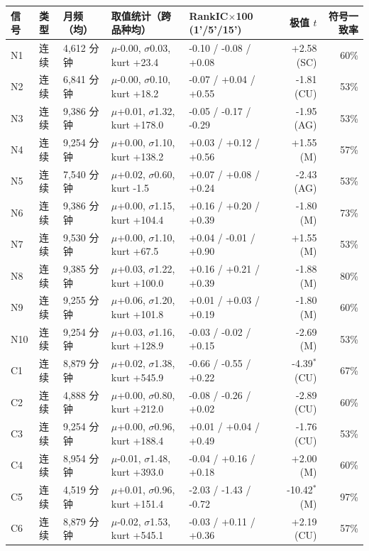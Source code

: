 \setlength{\tabcolsep}{3pt}
\begin{tabular}{lllllrr}
\toprule
信号 & 类型 & 月频（均） & 取值统计（跨品种均） & RankIC$\times$100 (1'/5'/15') & 极值 $t$ & 符号一致率 \\
\midrule
N1 & 连续 & 4,612 分钟 & $\mu$-0.00, $\sigma$0.03, kurt +23.4 & -0.10 / -0.08 / +0.08 & +2.58 (SC) & 60\% \\
N2 & 连续 & 6,841 分钟 & $\mu$-0.00, $\sigma$0.10, kurt +18.2 & -0.07 / +0.04 / +0.55 & -1.81 (CU) & 53\% \\
N3 & 连续 & 9,386 分钟 & $\mu$+0.01, $\sigma$1.32, kurt +178.0 & -0.05 / -0.17 / -0.29 & -1.95 (AG) & 53\% \\
N4 & 连续 & 9,254 分钟 & $\mu$+0.00, $\sigma$1.10, kurt +138.2 & +0.03 / +0.12 / +0.56 & +1.55 (M) & 57\% \\
N5 & 连续 & 7,540 分钟 & $\mu$+0.02, $\sigma$0.60, kurt -1.5 & +0.07 / +0.08 / +0.24 & -2.43 (AG) & 53\% \\
N6 & 连续 & 9,386 分钟 & $\mu$+0.00, $\sigma$1.15, kurt +104.4 & +0.16 / +0.20 / +0.39 & -1.80 (M) & 73\% \\
N7 & 连续 & 9,530 分钟 & $\mu$+0.00, $\sigma$1.10, kurt +67.5 & +0.04 / -0.01 / +0.90 & +1.55 (M) & 53\% \\
N8 & 连续 & 9,385 分钟 & $\mu$+0.03, $\sigma$1.22, kurt +100.0 & +0.16 / +0.21 / +0.39 & -1.88 (M) & 80\% \\
N9 & 连续 & 9,255 分钟 & $\mu$+0.06, $\sigma$1.20, kurt +101.8 & +0.01 / +0.03 / +0.19 & -1.80 (M) & 60\% \\
N10 & 连续 & 9,254 分钟 & $\mu$+0.03, $\sigma$1.16, kurt +128.9 & -0.03 / -0.02 / +0.15 & -2.69 (M) & 53\% \\
\addlinespace
C1 & 连续 & 8,879 分钟 & $\mu$+0.02, $\sigma$1.38, kurt +545.9 & -0.66 / -0.55 / +0.22 & -4.39$^{\ast}$ (CU) & 67\% \\
C2 & 连续 & 4,888 分钟 & $\mu$+0.00, $\sigma$0.80, kurt +212.0 & -0.08 / -0.26 / +0.02 & -2.89 (CU) & 60\% \\
C3 & 连续 & 9,254 分钟 & $\mu$+0.00, $\sigma$0.96, kurt +188.4 & +0.01 / +0.04 / +0.49 & -1.76 (CU) & 53\% \\
C4 & 连续 & 8,954 分钟 & $\mu$-0.01, $\sigma$1.48, kurt +393.0 & -0.04 / +0.16 / +0.18 & +2.00 (M) & 60\% \\
C5 & 连续 & 4,519 分钟 & $\mu$+0.01, $\sigma$0.96, kurt +151.4 & -2.03 / -1.43 / -0.72 & -10.42$^{\ast}$ (M) & 97\% \\
C6 & 连续 & 8,879 分钟 & $\mu$-0.02, $\sigma$1.53, kurt +545.1 & -0.03 / +0.11 / +0.36 & +2.19 (CU) & 57\% \\

\end{tabular}
